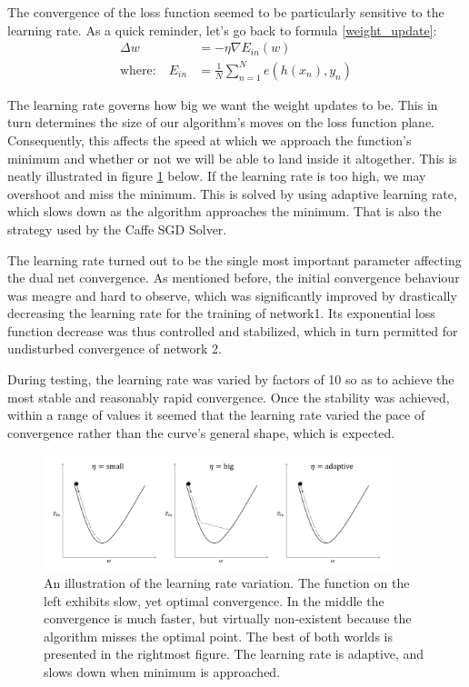 \documentclass[a4paper, 12pt]{article}
\numberwithin{equation}{section}
\begin{document}
	The convergence of the loss function seemed to be particularly sensitive to the learning rate. As a quick reminder, let's go back to formula \ref{weight_update}:
	\begin{align*}
	\Delta w &= - \eta \nabla E_{in}(w) \\
	\textrm{where:} \quad E_{in} &= \frac{1}{N} \sum_{n = 1}^{N} e(h(x_n), y_n)
	\end{align*}

	The learning rate governs how big we want the weight updates to be. This in turn determines the size of our algorithm's moves on the loss function plane. Consequently, this affects the speed at which we approach the function's minimum and whether or not we will be able to land inside it altogether. This is neatly illustrated in figure \ref{fig:learning_rate_overshoot} below. If the learning rate is too high, we may overshoot and miss the minimum. This is solved by using adaptive learning rate, which slows down as the algorithm approaches the minimum. That is also the strategy used by the Caffe SGD Solver.

	The learning rate turned out to be the single most important parameter affecting the dual net convergence. As mentioned before, the initial convergence behaviour was meagre and hard to observe, which was significantly improved by drastically decreasing the learning rate for the training of network1. Its exponential loss function decrease was thus controlled and stabilized, which in turn permitted for undisturbed convergence of network 2.

	During testing, the learning rate was varied by factors of 10 so as to achieve the most stable and reasonably rapid convergence. Once the stability was achieved, within a range of values it seemed that the learning rate varied the pace of convergence rather than the curve's general shape, which is expected.

	\begin{figure}[!h]
		\centering
		\includegraphics[page=1,width=0.9\textwidth]{learning_rate_overshoot.pdf}
		\caption{\label{fig:learning_rate_overshoot}{An illustration of the learning rate variation. The function on the left exhibits slow, yet optimal convergence. In the middle the convergence is much faster, but virtually non-existent because the algorithm misses the optimal point. The best of both worlds is presented in the rightmost figure. The learning rate is adaptive, and slows down when minimum is approached.}}
	\end{figure}
\end{document}

